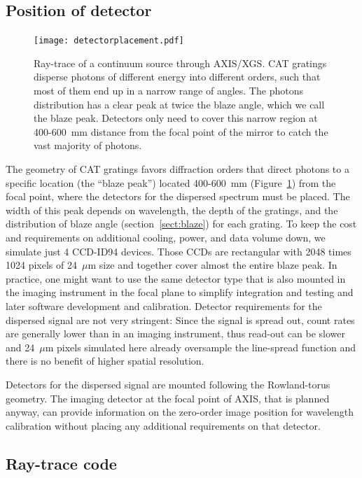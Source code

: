 \documentclass[12pt]{spieman}  %
\begin{document}
\begin{spacing}{1}
\subsection{Position of detector}
\label{sect:detpos}
\begin{figure} [ht]
\begin{center}
\texttt{[image: detectorplacement.pdf]}
\end{center}
\caption {\label{fig:det}
Ray-trace of a continuum source through AXIS/XGS. CAT gratings disperse photons of different energy into different orders, such that most of them end up in a narrow range of angles. The photons distribution has a clear peak at twice the blaze angle, which we call the blaze peak. Detectors only need to cover this narrow region at 400-600~mm distance from the focal point of the mirror to catch the vast majority of photons.
}
\end{figure}
The geometry of CAT gratings favors diffraction orders that direct photons to a specific location (the ``blaze peak'') located 400-600~mm (Figure~\ref{fig:det}) from the focal point, where the detectors for the dispersed spectrum must be placed. The width of this peak depends on wavelength, the depth of the gratings, and the distribution of blaze angle (section~\ref{sect:blaze}) for each grating. To keep the cost and requirements on additional cooling, power, and data volume down, we simulate just 4 CCD-ID94 devices. Those CCDs are rectangular with 2048 times 1024 pixels of 24~$\mu$m size and together cover almost the entire blaze peak. In practice, one might want to use the same detector type that is also mounted in the imaging instrument in the focal plane to simplify integration and testing and later software development and calibration. Detector requirements for the dispersed signal are not very stringent: Since the signal is spread out, count rates are generally lower than in an imaging instrument, thus read-out can be slower and  24~$\mu$m pixels simulated here already oversample the line-spread function and there is no benefit of higher spatial resolution.

Detectors for the dispersed signal are mounted following the Rowland-torus geometry. The imaging detector at the focal point of AXIS, that is planned anyway, can provide information on the zero-order image position for wavelength calibration without placing any additional requirements on that detector.

\subsection{Ray-trace code}
\label{sect:raytrace}


\end{spacing}
\end{document}
